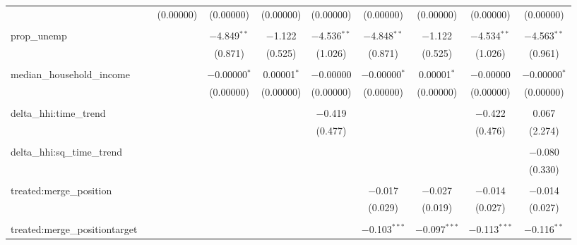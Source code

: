 \begin{table}[H]
{\begin{tabular}{@{\extracolsep{5pt}}lccccccccc}
   &  & (0.00000) & (0.00000) & (0.00000) & (0.00000) & (0.00000) & (0.00000) & (0.00000) & (0.00000) \\  

   & & & & & & & & & \\  

  prop\_unemp &  &  & $-$4.849$^{**}$ & $-$1.122 & $-$4.536$^{**}$ & $-$4.848$^{**}$ & $-$1.122 & $-$4.534$^{**}$ & $-$4.563$^{**}$ \\  

   &  &  & (0.871) & (0.525) & (1.026) & (0.871) & (0.525) & (1.026) & (0.961) \\  

   & & & & & & & & & \\  

  median\_household\_income &  &  & $-$0.00000$^{*}$ & 0.00001$^{*}$ & $-$0.00000 & $-$0.00000$^{*}$ & 0.00001$^{*}$ & $-$0.00000 & $-$0.00000$^{*}$ \\  

   &  &  & (0.00000) & (0.00000) & (0.00000) & (0.00000) & (0.00000) & (0.00000) & (0.00000) \\  

   & & & & & & & & & \\  

  delta\_hhi:time\_trend &  &  &  &  & $-$0.419 &  &  & $-$0.422 & 0.067 \\  

   &  &  &  &  & (0.477) &  &  & (0.476) & (2.274) \\  

   & & & & & & & & & \\  

  delta\_hhi:sq\_time\_trend &  &  &  &  &  &  &  &  & $-$0.080 \\  

   &  &  &  &  &  &  &  &  & (0.330) \\  

   & & & & & & & & & \\  

  treated:merge\_position &  &  &  &  &  & $-$0.017 & $-$0.027 & $-$0.014 & $-$0.014 \\  

   &  &  &  &  &  & (0.029) & (0.019) & (0.027) & (0.027) \\  

   & & & & & & & & & \\  

  treated:merge\_positiontarget &  &  &  &  &  & $-$0.103$^{***}$ & $-$0.097$^{***}$ & $-$0.113$^{***}$ & $-$0.116$^{**}$ \\  


\end{tabular}}
\end{table}
